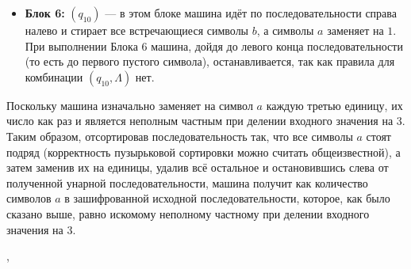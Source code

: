 \documentclass[a4paper,12pt]{article}
\newcommand {\gu} [1] {\guillemotleft#1\guillemotright}
\begin{document}
\begin{itemize}
        \item \textbf{Блок 6:} {\boldmath $(q_{10})$} --- в этом блоке машина идёт по последовательности справа налево и стирает все встречающиеся символы \gu{$b$}, а символы \gu{$a$} заменяет на \gu{$1$}. При выполнении Блока 6 машина, дойдя до левого конца последовательности (то есть до первого пустого символа), останавливается, так как правила для комбинации $(q_{10}, \Lambda)$ нет.
    \end{itemize}
    
    Поскольку машина изначально заменяет на символ \gu{$a$} каждую третью единицу, их число как раз и является неполным частным при делении входного значения на 3. Таким образом, отсортировав последовательность так, что все символы \gu{$a$} стоят подряд (корректность пузырьковой сортировки можно считать общеизвестной), а затем заменив их на единицы, удалив всё остальное и остановившись слева от полученной унарной последовательности, машина получит как количество символов \gu{$a$} в зашифрованной исходной последовательности, которое, как было сказано выше, равно искомому неполному частному при делении входного значения на 3.
    
    \sep
\end{document}
